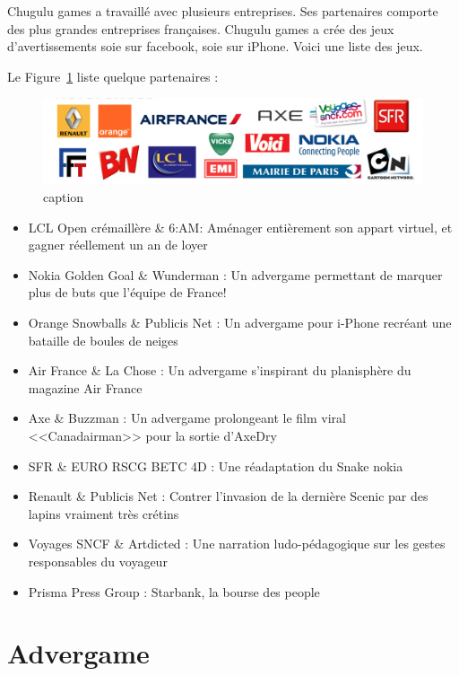 Chugulu games a travaillé avec plusieurs entreprises. Ses partenaires comporte des plus grandes entreprises françaises. Chugulu games a crée des jeux d'avertissements soie sur facebook, soie sur iPhone. Voici une liste des jeux.

Le Figure~\ref{fig:Image_chugulu_reference} liste quelque partenaires : 


\begin{figure}[htbp]
	\centering
		\includegraphics[width=6in]{Image/chugulu_reference.png}
	\caption{caption}
	\label{fig:Image_chugulu_reference}
\end{figure}


\begin{itemize}
	\item LCL Open crémaillère \& 6:AM: Aménager entièrement son appart virtuel, et gagner réellement un an de loyer 
	\item Nokia Golden Goal \& Wunderman : Un advergame permettant de marquer plus de buts que l'équipe de France!
	\item Orange Snowballs \& Publicis Net : Un advergame pour i-Phone recréant une bataille de boules de neiges
	\item Air France \& La Chose : Un advergame s'inspirant du planisphère du magazine Air France
	\item Axe \& Buzzman : Un advergame prolongeant le film viral <<Canadairman>> pour la sortie d'AxeDry
	\item SFR \& EURO RSCG BETC 4D : Une réadaptation du Snake nokia 
	\item Renault \& Publicis Net : Contrer l'invasion de la dernière Scenic par des lapins vraiment très crétins
	\item Voyages SNCF \& Artdicted : Une narration ludo-pédagogique sur les gestes responsables du voyageur
	\item Prisma Press Group : Starbank, la bourse des people 
\end{itemize}


\section{Advergame} %
\label{sub:advergame}

